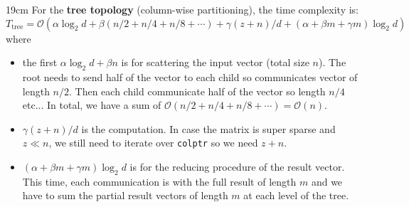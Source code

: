 \begin{parts}
\begin{solutionbox}{19cm}
            For the \textbf{tree topology} (column-wise partitioning),
            the time complexity is:
            \[
                T_{\text{tree}} = \mathcal{O}(\alpha \log_2 d + \beta (n/2 + n/4 + n/8 + \cdots) + \gamma (z + n) / d + (\alpha + \beta m + \gamma m) \log_2 d)
            \]
            where
            \begin{itemize}
                \item the first $\alpha \log_2 d + \beta n$ is for scattering the input vector (total size $n$).
                The root needs to send half of the vector to each child so communicates vector of length $n/2$.
                Then each child communicate half of the vector so length $n/4$ etc...
                In total, we have a sum of $\mathcal{O}(n/2 + n/4 + n/8 + \cdots) = \mathcal{O}(n)$.
                \item $\gamma (z + n) / d$ is the computation. In case the matrix is super sparse and $z \ll n$, we still need to iterate over \texttt{colptr} so we need $z + n$.
                \item $(\alpha + \beta m + \gamma m) \log_2 d$ is for the reducing procedure of the result vector. This time, each communication is with the full result of length $m$ and we have to sum the partial result vectors of length $m$ at each level of the tree.
            \end{itemize}
        \end{solutionbox}
\end{parts}

